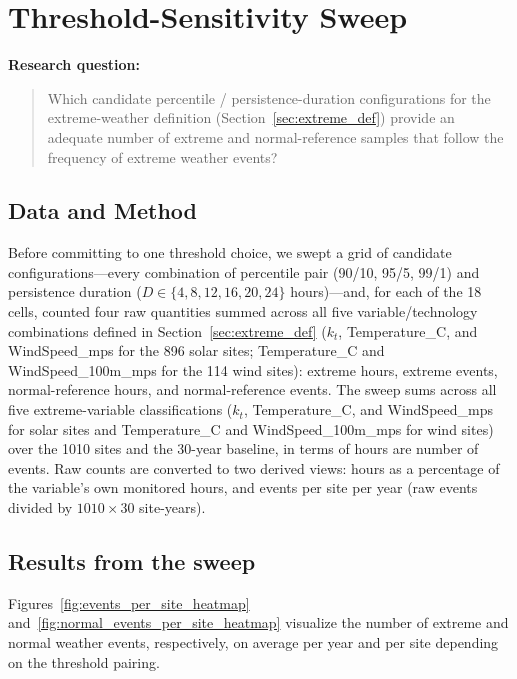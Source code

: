\section{Threshold-Sensitivity Sweep}\label{sec:extreme_sensitivity}

\textbf{Research question:}

\begin{quote}
Which candidate percentile / persistence-duration configurations for the extreme-weather
definition (Section~\ref{sec:extreme_def}) provide an adequate number of extreme and normal-reference samples that follow the frequency of extreme weather events?
\end{quote}

\subsection{Data and Method}

Before committing to one threshold choice, we swept a grid of candidate configurations---every
combination of percentile pair (90/10, 95/5, 99/1) and persistence duration
($D \in \{4,8,12,16,20,24\}$ hours)---and, for each of the 18 cells, counted four raw quantities
summed across all five variable/technology combinations defined in Section~\ref{sec:extreme_def}
($k_t$, Temperature\_C, and WindSpeed\_mps for the \num{896} solar sites; Temperature\_C and
WindSpeed\_100m\_mps for the \num{114} wind sites): extreme hours, extreme events, normal-reference
hours, and normal-reference events. The sweep sums across all five extreme-variable classifications
($k_t$, Temperature\_C, and WindSpeed\_mps for solar sites and Temperature\_C and WindSpeed\_100m\_mps for wind sites)
over the \num{1010} sites and the 30-year baseline, in terms of hours are number of events.
Raw counts are converted to two derived views: hours as a percentage of the variable's own monitored hours, and events per site per year
(raw events divided by $\num{1010}\times\num{30}$ site-years).

\subsection{Results from the sweep}

Figures~\ref{fig:events_per_site_heatmap} and~\ref{fig:normal_events_per_site_heatmap} visualize the number of extreme and normal weather events, respectively, on average per year and per site depending on the threshold pairing.

